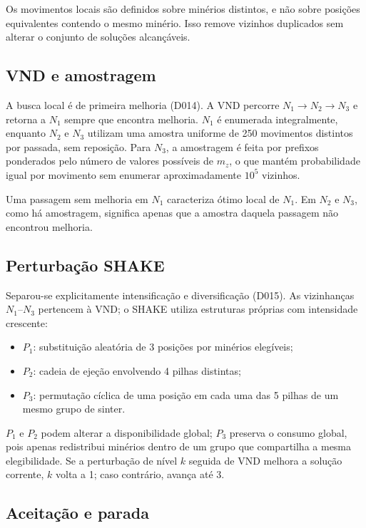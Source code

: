 \documentclass[10pt,twocolumn,a4paper]{article}
\begin{document}
Os movimentos locais são definidos sobre minérios distintos, e não sobre posições equivalentes contendo o mesmo minério. Isso remove vizinhos duplicados sem alterar o conjunto de soluções alcançáveis.

\subsection{VND e amostragem}

A busca local é de primeira melhoria (D014). A VND percorre $N_1 \to N_2 \to N_3$ e retorna a $N_1$ sempre que encontra melhoria. $N_1$ é enumerada integralmente, enquanto $N_2$ e $N_3$ utilizam uma amostra uniforme de 250 movimentos distintos por passada, sem reposição. Para $N_3$, a amostragem é feita por prefixos ponderados pelo número de valores possíveis de $m_z$, o que mantém probabilidade igual por movimento sem enumerar aproximadamente $10^5$ vizinhos.

Uma passagem sem melhoria em $N_1$ caracteriza ótimo local de $N_1$. Em $N_2$ e $N_3$, como há amostragem, significa apenas que a amostra daquela passagem não encontrou melhoria.

\subsection{Perturbação SHAKE}

Separou-se explicitamente intensificação e diversificação (D015). As vizinhanças $N_1$--$N_3$ pertencem à VND; o SHAKE utiliza estruturas próprias com intensidade crescente:
\begin{itemize}
    \item $P_1$: substituição aleatória de 3 posições por minérios elegíveis;
    \item $P_2$: cadeia de ejeção envolvendo 4 pilhas distintas;
    \item $P_3$: permutação cíclica de uma posição em cada uma das 5 pilhas de um mesmo grupo de sinter.
\end{itemize}
$P_1$ e $P_2$ podem alterar a disponibilidade global; $P_3$ preserva o consumo global, pois apenas redistribui minérios dentro de um grupo que compartilha a mesma elegibilidade. Se a perturbação de nível $k$ seguida de VND melhora a solução corrente, $k$ volta a 1; caso contrário, avança até 3.

\subsection{Aceitação e parada}
\end{document}
